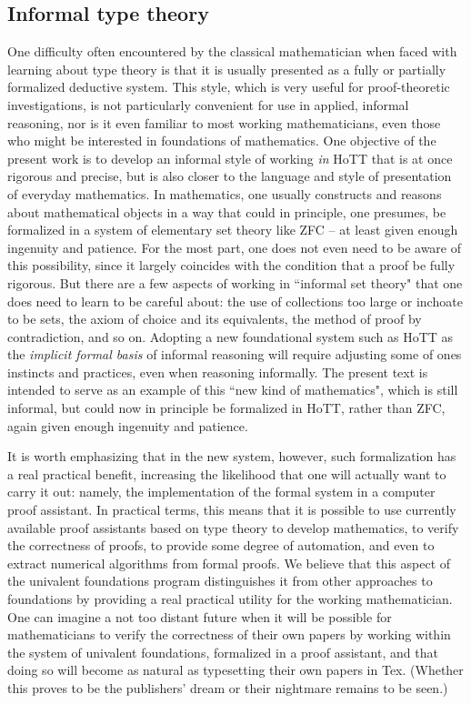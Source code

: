 {\subsection*{Informal type theory}

One difficulty often encountered by the classical mathematician when faced with learning about type theory is that it is usually presented as a fully or partially formalized deductive system.  This style, which is very useful for  proof-theoretic investigations, is not particularly convenient for use in applied, informal reasoning, nor is it even familiar to most working mathematicians, even those who might be interested in foundations of mathematics.  One objective of the present work is to develop an informal style of working \emph{in} HoTT that is at once rigorous and precise, but is also closer to the language and style of presentation of everyday mathematics.    In mathematics, one usually constructs and reasons about mathematical objects in a way that could in principle, one presumes, be formalized in a system of elementary set theory like ZFC -- at least given enough ingenuity and patience.  For the most part, one does not even need to be aware of this possibility, since it largely coincides with the condition that a proof be fully rigorous.  But there are a few aspects of working in ``informal set theory" that one does need to learn to be careful about: the use of collections too large or inchoate to  be sets, the axiom of choice and its equivalents,  the method of proof by contradiction, and so on.  Adopting a new foundational system such as HoTT as the \emph{implicit formal basis} of informal reasoning will require adjusting some of ones instincts and practices, even when reasoning informally.  The present text is intended to serve as an example of this ``new kind of mathematics", which is still informal, but could now in principle be formalized in HoTT, rather than ZFC, again given enough ingenuity and patience.

It is worth emphasizing that in the new system, however, such formalization has a real practical benefit, increasing the likelihood that one will actually want to carry it out: namely, the implementation of the formal system in a computer proof assistant.  In practical terms, this means that it is possible to use currently available proof assistants based on type theory to develop mathematics, to verify the correctness of proofs, to provide some degree of automation, and even to extract numerical algorithms from formal proofs.  We believe that this aspect of the univalent foundations program distinguishes it from other approaches to foundations by providing a real practical utility for the working mathematician.  One can imagine a not too distant future when it will be possible for mathematicians  to verify the correctness of their own papers by working within the system of univalent foundations, formalized in a proof assistant, and that doing so will become as natural as typesetting their own papers in Tex. (Whether this proves to be the publishers' dream or their nightmare  remains to be seen.) 

}
